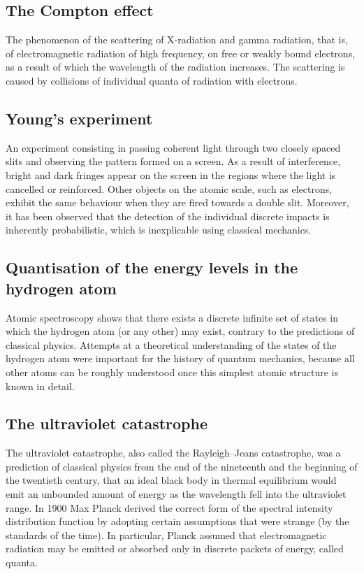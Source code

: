 \subsection{The Compton effect}

The phenomenon of the scattering of X-radiation and gamma radiation, that is, of electromagnetic radiation of high frequency, on free or weakly bound electrons, as a result of which the wavelength of the radiation increases. The scattering is caused by collisions of individual quanta of radiation with electrons.

\subsection{Young's experiment}

An experiment consisting in passing coherent light through two closely spaced slits and observing the pattern formed on a screen. As a result of interference, bright and dark fringes appear on the screen in the regions where the light is cancelled or reinforced. Other objects on the atomic scale, such as electrons, exhibit the same behaviour when they are fired towards a double slit. Moreover, it has been observed that the detection of the individual discrete impacts is inherently probabilistic, which is inexplicable using classical mechanics.

\subsection{Quantisation of the energy levels in the hydrogen atom}

Atomic spectroscopy shows that there exists a discrete infinite set of states in which the hydrogen atom (or any other) may exist, contrary to the predictions of classical physics. Attempts at a theoretical understanding of the states of the hydrogen atom were important for the history of quantum mechanics, because all other atoms can be roughly understood once this simplest atomic structure is known in detail.

\subsection{The ultraviolet catastrophe}

The ultraviolet catastrophe, also called the Rayleigh--Jeans catastrophe, was a prediction of classical physics from the end of the nineteenth and the beginning of the twentieth century, that an ideal black body in thermal equilibrium would emit an unbounded amount of energy as the wavelength fell into the ultraviolet range. In 1900 Max Planck derived the correct form of the spectral intensity distribution function by adopting certain assumptions that were strange (by the standards of the time). In particular, Planck assumed that electromagnetic radiation may be emitted or absorbed only in discrete packets of energy, called quanta.

